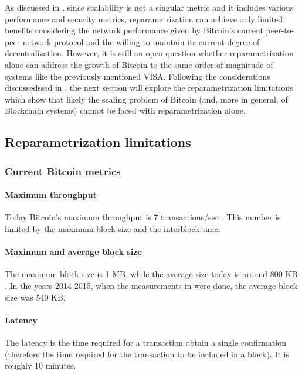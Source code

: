 As discussed in \cite{croman-scaling-blockchain}, since scalability is not a
singular metric and it includes various performance and security metrics,
reparametrization can achieve only limited benefits considering the network
performance given by Bitcoin’s current peer-to-peer network protocol and the
willing to maintain its current degree of decentralization. However, it is still
an open question whether reparametrization alone can address the growth of
Bitcoin to the same order of magnitude of systems like the previously mentioned
VISA. Following the considerations discussedssed in
\cite{croman-scaling-blockchain}, the next section will explore the
reparametrization limitations which show that likely the scaling problem of
Bitcoin (and, more in general, of Blockchain systems) cannot be faced with
reparametrization alone.

\subsection{Reparametrization limitations}

\subsubsection{Current Bitcoin metrics}
\paragraph{Maximum throughput}  Today Bitcoin’s maximum throughput is 7
transactions/sec \cite{wikipedia_scalability_2018}. This number is limited by
the maximum block size and the interblock time.

\paragraph{Maximum and average block size} The maximum block size is 1 MB, while
the average size today is around 800 KB \cite{current-block-size}. In the years
2014-2015, when the measurements in \cite{croman-scaling-blockchain} were done,
the average block size was 540 KB.

\paragraph{Latency} The latency is the time required for a transaction obtain a
single confirmation (therefore the time required for the transaction to be
included in a block). It is roughly 10 minutes.





